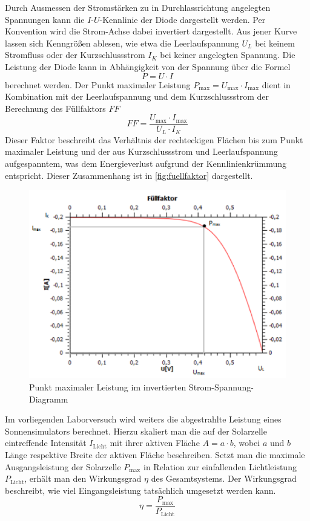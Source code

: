\documentclass[english, ngerman]{scrartcl}
\newcommand{\FF}{\ensuremath{\mathit{FF}}}
\begin{document}
Durch Ausmessen der Stromstärken zu in Durchlassrichtung angelegten Spannungen kann die $I$-$U$-Kennlinie der Diode	dargestellt werden. Per Konvention wird die Strom-Achse dabei invertiert dargestellt. Aus jener Kurve lassen sich Kenngrößen ablesen, wie etwa die Leerlaufspannung $U_L$ bei keinem Stromfluss oder der Kurzschlussstrom $I_K$ bei keiner angelegten Spannung. Die Leistung der Diode kann in Abhängigkeit von der Spannung über die Formel
%
\begin{equation}
    \label{eq:leistung}
    P = U \cdot I
\end{equation}
%
berechnet werden. Der Punkt maximaler Leistung $P_{\text{max}} = U_{\text{max}} \cdot I_{\text{max}}$ dient in Kombination mit der Leerlaufspannung und dem Kurzschlussstrom der Berechnung des Füllfaktors $\FF$
%
\begin{equation}
    \label{eq:fuellfaktor}
    \FF = \frac{U_{\text{max}} \cdot I_{\text{max}}}{U_L \cdot I_K}
\end{equation}
%
Dieser Faktor beschreibt das Verhältnis der rechteckigen Flächen bis zum Punkt maximaler Leistung und der aus Kurzschlussstrom und Leerlaufspannung aufgespanntem, was dem Energieverlust aufgrund der Kennlinienkrümmung entspricht. Dieser Zusammenhang ist in \autoref{fig:fuellfaktor} dargestellt.
%
\begin{figure}[H]
    \centering
    \begin{samepage}
        \includegraphics[width=0.7\linewidth]{fig/fuellfaktor.png}
        \caption[Füllfaktor]{Punkt maximaler Leistung im invertierten Strom-Spannung-Diagramm}
        \label{fig:fuellfaktor}
    \end{samepage}
\end{figure}

Im vorliegenden Laborversuch wird weiters die abgestrahlte Leistung eines Sonnensimulators berechnet. Hierzu skaliert man die auf der Solarzelle eintreffende Intensität $I_{\text{Licht}}$ mit ihrer aktiven Fläche $A = a \cdot b$, wobei $a$ und $b$ Länge respektive Breite der aktiven Fläche beschreiben. Setzt man die maximale Ausgangsleistung der Solarzelle $P_{\text{max}}$ in Relation zur einfallenden Lichtleistung $P_{\text{Licht}}$, erhält man den Wirkungsgrad $\eta$ des Gesamtsystems. Der Wirkungsgrad beschreibt, wie viel Eingangsleistung tatsächlich umgesetzt werden kann.
%
\begin{equation}
    \label{eq:wirkungsgrad}
    \eta = \frac{P_{\text{max}}}{P_{\text{Licht}}}
\end{equation}
\end{document}
